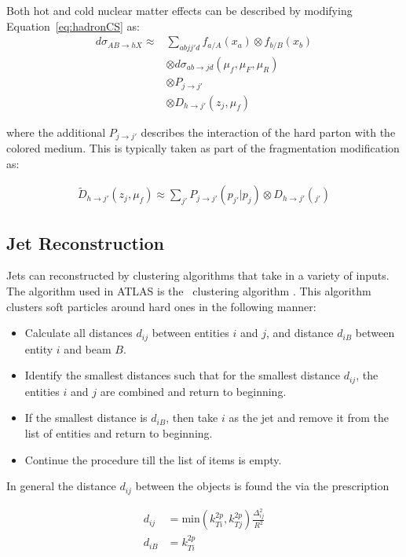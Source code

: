 Both hot and cold nuclear matter effects can be described by modifying Equation~\ref{eq:hadronCS} as:
\begin{align}
d \sigma_{AB \rightarrow hX}  \approx & \sum_{abjj'd} f_{a/A} (x_a) \otimes f_{b/B} (x_b) \\ 
& \otimes d\sigma_{ab\rightarrow jd} (\mu_f, \mu_F, \mu_R)  \nonumber \\
& \otimes P_{j\rightarrow j'} \nonumber \\
& \otimes D_{h \rightarrow j'} (z_j, \mu_f) \nonumber 
\end{align}

where the additional $P_{j\rightarrow j'}$ describes the interaction of the hard parton with the colored medium. This is typically taken as part of the fragmentation modification as:

\begin{align}
\widetilde{D}_{h \rightarrow j'} (z_j, \mu_f) \approx \sum_{j'} P_{j\rightarrow j'} (p_{j'} | p_j) \otimes D_{h\rightarrow j'} (_{j'})
\end{align}

\subsection{Jet Reconstruction}
Jets can reconstructed by clustering algorithms that take in a variety of inputs. The algorithm used in ATLAS is the \antikt\ clustering algorithm \cite{Cacciari:2008gp}. This algorithm clusters soft particles around hard ones in the following manner:

\begin{itemize}
\item Calculate all distances $d_{ij}$ between entities $i$ and $j$, and distance $d_{iB}$ between entity $i$ and beam $B$.
\item Identify the smallest distances such that for the smallest distance $d_{ij}$, the entities $i$ and $j$ are combined and return to beginning.
\item If the smallest distance is $d_{iB}$, then take $i$ as the jet and remove it from the list of entities and return to beginning.
\item Continue the procedure till the list of items is empty.
\end{itemize}

In general the distance $d_{ij}$ between the objects is found the via the prescription

\begin{align}
d_{ij} &= \mathrm{min} (k_{Ti}^{2p} , k_{Tj}^{2p}) \frac{\Delta_{ij}^2}{R^2}  \\
d_{iB} &= k_{Ti}^{2p}
\end{align}

